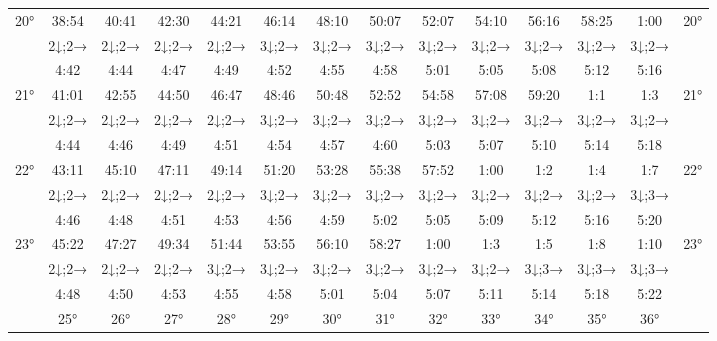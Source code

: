 \begin{scriptsize}
\begin{tabular}{c || c | c | c | c | c | c | c | c | c | c | c | c || c}
		\multirow{3}{*}{20°}&38:54&40:41&42:30&44:21&46:14&48:10&50:07&52:07&54:10&56:16&58:25&1:00&\multirow{3}{*}{20°}\\ \space&2↓;2→&2↓;2→&2↓;2→&2↓;2→&3↓;2→&3↓;2→&3↓;2→&3↓;2→&3↓;2→&3↓;2→&3↓;2→&3↓;2→&\space\\&4:42&4:44&4:47&4:49&4:52&4:55&4:58&5:01&5:05&5:08&5:12&5:16&\space\\\hline
		\multirow{3}{*}{21°}&41:01&42:55&44:50&46:47&48:46&50:48&52:52&54:58&57:08&59:20&1:1&1:3&\multirow{3}{*}{21°}\\ \space&2↓;2→&2↓;2→&2↓;2→&2↓;2→&3↓;2→&3↓;2→&3↓;2→&3↓;2→&3↓;2→&3↓;2→&3↓;2→&3↓;2→&\space\\&4:44&4:46&4:49&4:51&4:54&4:57&4:60&5:03&5:07&5:10&5:14&5:18&\space\\\hline
		\multirow{3}{*}{22°}&43:11&45:10&47:11&49:14&51:20&53:28&55:38&57:52&1:00&1:2&1:4&1:7&\multirow{3}{*}{22°}\\ \space&2↓;2→&2↓;2→&2↓;2→&2↓;2→&3↓;2→&3↓;2→&3↓;2→&3↓;2→&3↓;2→&3↓;2→&3↓;2→&3↓;3→&\space\\&4:46&4:48&4:51&4:53&4:56&4:59&5:02&5:05&5:09&5:12&5:16&5:20&\space\\\hline
		\multirow{3}{*}{23°}&45:22&47:27&49:34&51:44&53:55&56:10&58:27&1:00&1:3&1:5&1:8&1:10&\multirow{3}{*}{23°}\\ \space&2↓;2→&2↓;2→&2↓;2→&3↓;2→&3↓;2→&3↓;2→&3↓;2→&3↓;2→&3↓;2→&3↓;3→&3↓;3→&3↓;3→&\space\\&4:48&4:50&4:53&4:55&4:58&5:01&5:04&5:07&5:11&5:14&5:18&5:22&\space\\\hline
		\hline\space &25°&26°&27°&28°&29°&30°&31°&32°&33°&34°&35°&36°
\end{tabular}\end{scriptsize}

